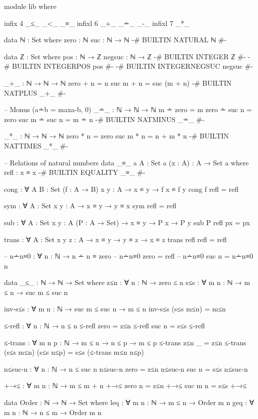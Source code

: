 \documentclass{article}
\begin{document}
\begin{prev}
\begin{code}
module lib where

infix 4 _≤_ _<_ _≡_
infixl 6 _+_ _∸_ _-_
infixl 7 _*_

data ℕ : Set where
    zero : ℕ
    suc : ℕ → ℕ
{-# BUILTIN NATURAL ℕ #-}

data ℤ : Set where
    pos : ℕ → ℤ
    negsuc : ℕ → ℤ
{-# BUILTIN INTEGER       ℤ    #-}
{-# BUILTIN INTEGERPOS    pos    #-}
{-# BUILTIN INTEGERNEGSUC negsuc #-}

_+_ : ℕ → ℕ → ℕ
zero + n = n
suc m + n = suc (m + n)
{-# BUILTIN NATPLUS _+_ #-}

-- Monus (a∸b = max{a-b, 0})
_∸_ : ℕ → ℕ → ℕ
m ∸ zero = m
zero ∸ suc n = zero
suc m ∸ suc n = m ∸ n
{-# BUILTIN NATMINUS _∸_ #-}

_*_ : ℕ → ℕ → ℕ
zero * n = zero
suc m * n = n + m * n
{-# BUILTIN NATTIMES _*_ #-}

-- Relations of natural numbers
data _≡_ {a} {A : Set a} (x : A) : A → Set a where
  refl : x ≡ x
{-# BUILTIN EQUALITY _≡_  #-}

cong : ∀ {A B : Set} (f : A → B) {x y : A} → x ≡ y → f x ≡ f y
cong f refl = refl

sym : ∀ {A : Set} {x y : A} → x ≡ y → y ≡ x
sym refl = refl

sub : ∀ {A : Set} {x y : A} (P : A → Set) → x ≡ y → P x → P y
sub P refl px = px

trans : ∀ {A : Set} {x y z : A} → x ≡ y → y ≡ z → x ≡ z
trans refl refl = refl

-- n∸n≡0 : ∀ {n : ℕ} → n ∸ n ≡ zero
-- n∸n≡0 {zero} = refl
-- n∸n≡0 {suc n} = n∸n≡0 {n}

data _≤_ : ℕ → ℕ → Set where
    z≤n : ∀ {n : ℕ} → zero ≤ n
    s≤s : ∀ {m n : ℕ} → m ≤ n → suc m ≤ suc n

inv-s≤s : ∀ {m n : ℕ} → suc m ≤ suc n → m ≤ n
inv-s≤s (s≤s m≤n) = m≤n

≤-refl : ∀ {n : ℕ} → n ≤ n
≤-refl {zero} = z≤n
≤-refl {suc n} = s≤s ≤-refl

≤-trans : ∀ {m n p : ℕ} → m ≤ n → n ≤ p → m ≤ p
≤-trans z≤n _ = z≤n
≤-trans (s≤s m≤n) (s≤s n≤p) = s≤s (≤-trans m≤n n≤p)

n≤suc-n : ∀ {n : ℕ} → n ≤ suc n
n≤suc-n {zero} = z≤n
n≤suc-n {suc n} = s≤s n≤suc-n

+→≤ : ∀ {m n : ℕ} → m ≤ m + n
+→≤ {zero} {n} = z≤n
+→≤ {suc m} {n} = s≤s +→≤

data Order : ℕ → ℕ → Set where
    leq : ∀ {m n : ℕ} → m ≤ n → Order m n
    geq : ∀ {m n : ℕ} → n ≤ m → Order m n


\end{code}
\end{prev}
\end{document}
